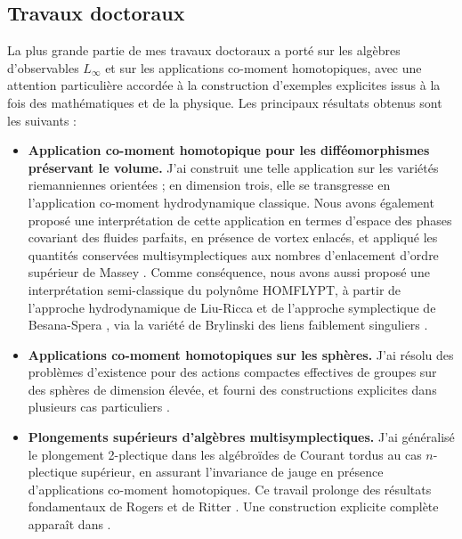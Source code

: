 \documentclass[a4paper]{article}
\begin{document}
\subsection*{Travaux doctoraux}

La plus grande partie de mes travaux doctoraux \cite{Miti2021b} a porté sur les algèbres d’observables \(L_\infty\) et sur les applications co-moment homotopiques, avec une attention particulière accordée à la construction d’exemples explicites issus à la fois des mathématiques et de la physique. Les principaux résultats obtenus sont les suivants :

\begin{itemize}[noitemsep,topsep=0pt,parsep=0pt,partopsep=0pt]
\item \textbf{Application co-moment homotopique pour les difféomorphismes préservant le volume.}
J’ai construit une telle application sur les variétés riemanniennes orientées ; en dimension trois, elle se transgresse en l’application co-moment hydrodynamique classique.
Nous avons également proposé une interprétation de cette application en termes d’espace des phases covariant des fluides parfaits, en présence de vortex enlacés, et appliqué les quantités conservées multisymplectiques aux nombres d’enlacement d’ordre supérieur de Massey \cite{Miti2021a}.
Comme conséquence, nous avons aussi proposé une interprétation semi-classique du polynôme HOMFLYPT, à partir de l’approche hydrodynamique de Liu-Ricca \cite{LiuRicca15} et de l’approche symplectique de Besana-Spera \cite{BesanaSpera06}, via la variété de Brylinski des liens faiblement singuliers \cite{Miti2021c}.

\item \textbf{Applications co-moment homotopiques sur les sphères.}
J’ai résolu des problèmes d’existence pour des actions compactes effectives de groupes sur des sphères de dimension élevée, et fourni des constructions explicites dans plusieurs cas particuliers \cite{Miti2020}.

\item \textbf{Plongements supérieurs d’algèbres multisymplectiques.}
J’ai généralisé le plongement 2-plectique dans les algébroïdes de Courant tordus au cas \(n\)-plectique supérieur, en assurant l’invariance de jauge en présence d’applications co-moment homotopiques.
Ce travail prolonge des résultats fondamentaux de Rogers \cite{Rogers2013} et de Ritter \cite{Ritter2015a}.
Une construction explicite complète apparaît dans \cite{Miti2024}.
\end{itemize}
\end{document}
